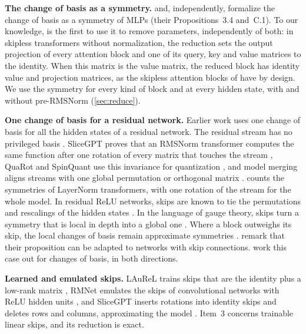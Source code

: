 \documentclass[10pt]{article}
\theoremstyle{definition}
\theoremstyle{remark}
\newcommand{\para}[1]{\smallskip\noindent\textbf{#1}\hspace{0.5em}}
\begin{document}
\para{The change of basis as a symmetry.} \citet{godfrey2022symmetries} and, independently, \citet{zhao2023symmetries} formalize the change of basis as a symmetry of MLPs (their Propositions~3.4 and~C.1). To our knowledge, \citet{graef2024tricks} is the first to use it to remove parameters, independently of both: in skipless transformers without normalization, the reduction sets the output projection of every attention block and one of its query, key and value matrices to the identity. When this matrix is the value matrix, the reduced block has identity value and projection matrices, as the skipless attention blocks of \citet{he2024simplifying} have by design. We use the symmetry for every kind of block and at every hidden state, with and without pre-RMSNorm (\cref{sec:reduce}).

\para{One change of basis for a residual network.} Earlier work uses one change of basis for all the hidden states of a residual network. The residual stream has no privileged basis \citep{elhage2021circuits}. SliceGPT proves that an RMSNorm transformer computes the same function after one rotation of every matrix that touches the stream \citep[Theorem~1]{ashkboos2024slicegpt}, QuaRot and SpinQuant use this invariance for quantization \citep{ashkboos2024quarot,liu2024spinquant}, and model merging aligns streams with one global permutation \citep[Section~3.3]{verma2024merging} or orthogonal matrix \citep{theus2025glmc}. \citet{vannierop2024gauge} counts the symmetries of LayerNorm transformers, with one rotation of the stream for the whole model. In residual ReLU networks, skips are known to tie the permutations and rescalings of the hidden states \citep[Remark~3.6]{godfrey2022symmetries}. In the language of gauge theory, skips turn a symmetry that is local in depth into a global one \citep{hashimoto2024unification}. Where a block outweighs its skip, the local changes of basis remain approximate symmetries \citep[Section~6.4]{gong2026aro}. \citet{zhao2023symmetries} remark that their proposition can be adapted to networks with skip connections.  work this case out for changes of basis, in both directions.

\para{Learned and emulated skips.} LAuReL trains skips that are the identity plus a low-rank matrix \citep{menghani2024laurel}, RMNet emulates the skips of convolutional networks with ReLU hidden units \citep{meng2021rmnet}, and SliceGPT inserts rotations into identity skips and deletes rows and columns, approximating the model \citep[Sections~3.3 and~3.4]{ashkboos2024slicegpt}. Item~3 concerns trainable linear skips, and its reduction is exact.
\end{document}
